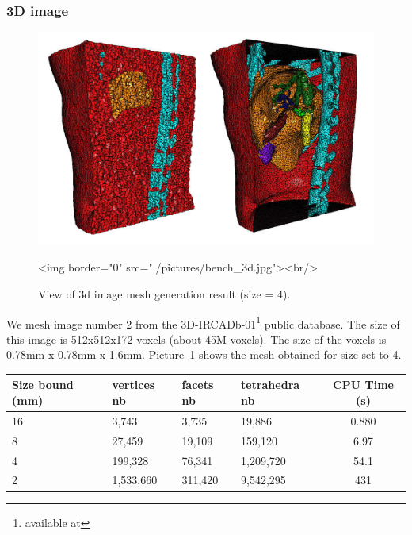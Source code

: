 \subsubsection{3D image}

\begin{figure}[ht]
\begin{center}
 \begin{ccTexOnly}
   \includegraphics[width=14cm]{Mesh_3/pictures/bench_3d.jpg}
 \end{ccTexOnly}
 \begin{ccHtmlOnly}
   <img border="0" src="./pictures/bench_3d.jpg"><br/>
 \end{ccHtmlOnly}
 \caption{View of 3d image mesh generation result (size = 4).}
  \label{figure:mesh_3_benchmark_3d_image}
\end{center}
\end{figure}

We mesh image number 2 from the 3D-IRCADb-01\footnote{available at  } public database.
The size of this image is 512x512x172 voxels (about 45M voxels). The size of the voxels
is 0.78mm x 0.78mm x 1.6mm. Picture~\ref{figure:mesh_3_benchmark_3d_image}
shows the mesh obtained for size set to 4.

\begin{center}
\begin{tabular}{|l|l|l|l||c|}
  \hline
  Size bound (mm) & vertices nb & facets nb & tetrahedra nb & CPU Time (s) \\
  \hline
  16 & 3,743 & 3,735 & 19,886 & 0.880 \\
  8 & 27,459 & 19,109 & 159,120 & 6.97 \\
  4 & 199,328 & 76,341 & 1,209,720 & 54.1 \\
  2 & 1,533,660 & 311,420 & 9,542,295 & 431 \\
  \hline
\end{tabular}
\end{center}

